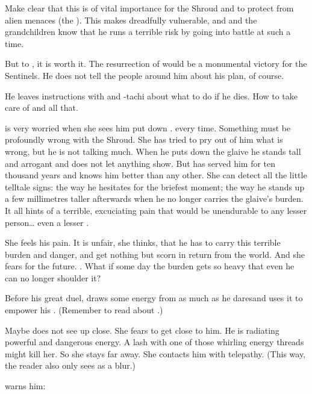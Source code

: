 Make clear that this is of vital importance for the Shroud and to protect \Miith{} from alien menaces (the \banes). 
This makes \Ishnaruchaefir{} dreadfully vulnerable, and \Criseis{} and the grandchildren know that he runs a terrible risk by going into battle at such a time. 

But to \Ishnaruchaefir, it is worth it. 
The resurrection of \Nithdornazsh{} would be a monumental victory for the Sentinels. 
He does not tell the people around him about his plan, of course. 

He leaves instructions with \Criseis{} and \Thiencaste-tachi about what to do if he dies. 
How to take care of \Rystessakhin{} and all that. 

\Criseis{} is very worried when she sees him put down \Rystessakhin. 
 every time. 
Something must be profoundly wrong with the Shroud. 
She has tried to pry out of him what is wrong, but he is not talking much. 
When he puts down the glaive he stands tall and arrogant and does not let anything show. 
But \Criseis{} has served him for ten thousand years and knows him better than any other. 
She can detect all the little telltale signs: 
the way he hesitates for the briefest moment; the way he stands up a few millimetres taller afterwards when he no longer carries the glaive's burden. 
It all hints of a terrible, excuciating pain that would be unendurable to any lesser person\ldots{} even a lesser \dragon. 

She feels his pain. 
It is unfair, she thinks, that he has to carry this terrible burden and danger, and get nothing but scorn in return from the world. 
And she fears for the future. 
. 
What if some day the burden gets so heavy that even he can no longer shoulder it? 

Before his great duel, \Ishnaruchaefir{} draws some energy from \Rystessakhin \dash as much as he dares\dash and uses it to empower his . 
(Remember to read about .)

Maybe \Criseis does not see \Ishnaruchaefir up close. 
She fears to get close to him.
He is radiating powerful and dangerous energy.
A lash with one of those whirling energy threads might kill her.
So she stays far away.
She contacts him with telepathy. 
(This way, the reader also only sees \Ishnaruchaefir as a blur.)

\Criseis warns him:

